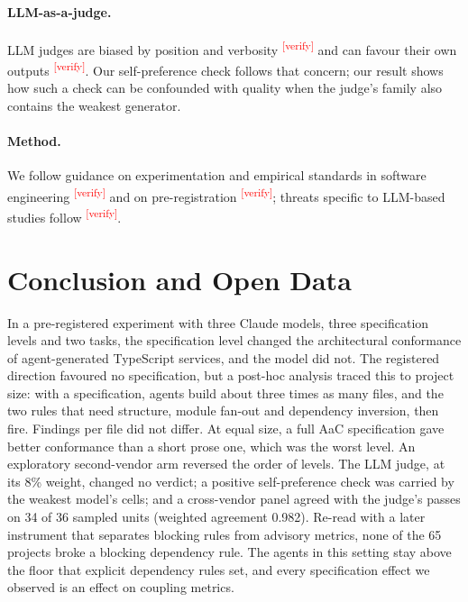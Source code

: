 \documentclass[10pt,a4paper]{article}
\newcommand{\citeneeded}[1]{\cite{#1}\textsuperscript{\textcolor{red}{\tiny[verify]}}}
\begin{document}
\paragraph{LLM-as-a-judge.} LLM judges are biased by position and verbosity \citeneeded{wang2023fair,zheng2023judging}
and can favour their own outputs \citeneeded{panickssery2024self,wataoka2024selfpref}. Our self-preference check
follows that concern; our result shows how such a check can be confounded with quality when the judge's family also
contains the weakest generator.

\paragraph{Method.} We follow guidance on experimentation and empirical standards in software engineering
\citeneeded{kitchenham2002guidelines,wohlin2012experimentation,ralph2020standards} and on pre-registration
\citeneeded{nosek2018prereg}; threats specific to LLM-based studies follow \citeneeded{sallou2024breaking}.

\section{Conclusion and Open Data}\label{sec:conclusion}

In a pre-registered experiment with three Claude models, three specification levels and two tasks, the
specification level changed the architectural conformance of agent-generated TypeScript services, and the model did
not. The registered direction favoured no specification, but a post-hoc analysis traced this to project size: with a
specification, agents build about three times as many files, and the two rules that need structure, module fan-out
and dependency inversion, then fire. Findings per file did not differ. At equal size, a full AaC specification gave
better conformance than a short prose one, which was the worst level. An exploratory second-vendor arm reversed the
order of levels. The LLM judge, at its 8\% weight, changed no verdict; a positive self-preference check was carried
by the weakest model's cells; and a cross-vendor panel agreed with the judge's passes on 34 of 36 sampled units (weighted agreement 0.982).
Re-read with a later instrument that separates blocking rules from advisory metrics, none of the 65 projects broke
a blocking dependency rule. The agents in this setting stay above the floor that explicit dependency rules set, and
every specification effect we observed is an effect on coupling metrics.
\end{document}
